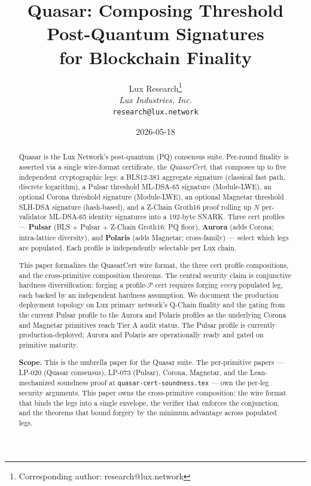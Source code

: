\documentclass[11pt,a4paper]{article}
\title{Quasar: Composing Threshold Post-Quantum Signatures\\
for Blockchain Finality}
\author{
Lux Research\thanks{Corresponding author: research@lux.network}\\
\textit{Lux Industries, Inc.}\\
\texttt{research@lux.network}
}
\date{2026-05-18}
\begin{document}
\luxcoverpage

\begin{abstract}
\noindent
Quasar is the Lux Network's post-quantum (PQ) consensus suite.
Per-round finality is asserted via a single wire-format certificate,
the \emph{QuasarCert}, that composes up to five independent
cryptographic legs: a BLS12-381 aggregate signature (classical fast
path, discrete logarithm), a Pulsar threshold ML-DSA-65 signature
(Module-LWE), an optional Corona threshold signature (Module-LWE), an
optional Magnetar threshold SLH-DSA signature (hash-based), and a
Z-Chain Groth16 proof rolling up $N$ per-validator ML-DSA-65 identity
signatures into a 192-byte SNARK. Three cert profiles ---
\textbf{Pulsar} (BLS + Pulsar + Z-Chain Groth16; PQ floor),
\textbf{Aurora} (adds Corona; intra-lattice diversity), and
\textbf{Polaris} (adds Magnetar; cross-family) --- select which legs
are populated. Each profile is independently selectable per Lux
chain.

This paper formalizes the QuasarCert wire format, the three cert
profile compositions, and the cross-primitive composition theorems.
The central security claim is conjunctive hardness diversification:
forging a profile-$\mathcal{P}$ cert requires forging \emph{every}
populated leg, each backed by an independent hardness assumption.
We document the production deployment topology on Lux primary
network's Q-Chain finality and the gating from the current Pulsar
profile to the Aurora and Polaris profiles as the underlying
Corona and Magnetar primitives reach Tier A audit status. The
Pulsar profile is currently production-deployed; Aurora and
Polaris are operationally ready and gated on primitive maturity.

\textbf{Scope.} This is the umbrella paper for the Quasar suite.
The per-primitive papers --- LP-020 (Quasar consensus), LP-073
(Pulsar), Corona, Magnetar, and the Lean-mechanized soundness proof
at \texttt{quasar-cert-soundness.tex} --- own the per-leg security
arguments. This paper owns the cross-primitive composition: the wire
format that binds the legs into a single envelope, the verifier that
enforces the conjunction, and the theorems that bound forgery by the
minimum advantage across populated legs.
\end{abstract}

\tableofcontents
\newpage












\end{document}
